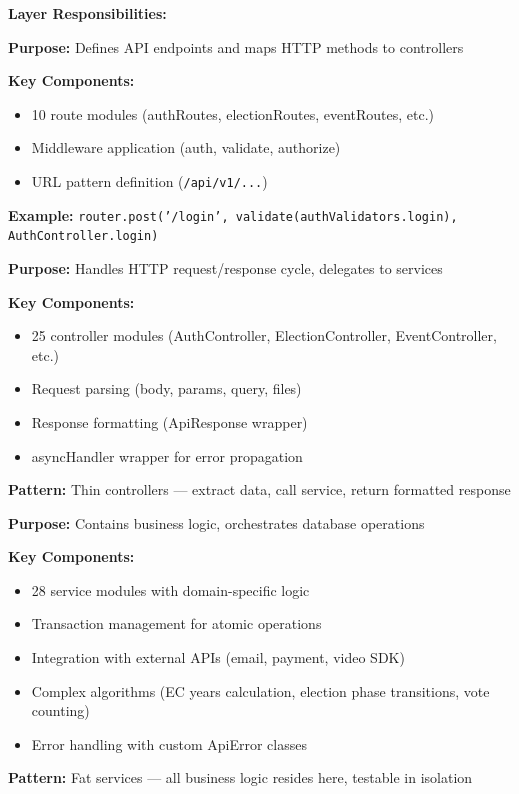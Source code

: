 \documentclass[12pt,a4paper]{article}
\begin{document}
\textbf{Layer Responsibilities:}

\begin{tcolorbox}[colback=LightTeal, colframe=Teal, title=\textbf{1. Routes Layer} (\texttt{src/routes/}), fonttitle=\bfseries]
\textbf{Purpose:} Defines API endpoints and maps HTTP methods to controllers

\textbf{Key Components:}
\begin{itemize}[noitemsep]
  \item 10 route modules (authRoutes, electionRoutes, eventRoutes, etc.)
  \item Middleware application (auth, validate, authorize)
  \item URL pattern definition (\texttt{/api/v1/...})
\end{itemize}

\textbf{Example:} \texttt{router.post('/login', validate(authValidators.login), AuthController.login)}
\end{tcolorbox}

\begin{tcolorbox}[colback=LightBlue, colframe=Teal, title=\textbf{2. Controllers Layer} (\texttt{src/controllers/}), fonttitle=\bfseries]
\textbf{Purpose:} Handles HTTP request/response cycle, delegates to services

\textbf{Key Components:}
\begin{itemize}[noitemsep]
  \item 25 controller modules (AuthController, ElectionController, EventController, etc.)
  \item Request parsing (body, params, query, files)
  \item Response formatting (ApiResponse wrapper)
  \item asyncHandler wrapper for error propagation
\end{itemize}

\textbf{Pattern:} Thin controllers — extract data, call service, return formatted response
\end{tcolorbox}

\begin{tcolorbox}[colback=LightGold, colframe=Teal, title=\textbf{3. Services Layer} (\texttt{src/services/}), fonttitle=\bfseries]
\textbf{Purpose:} Contains business logic, orchestrates database operations

\textbf{Key Components:}
\begin{itemize}[noitemsep]
  \item 28 service modules with domain-specific logic
  \item Transaction management for atomic operations
  \item Integration with external APIs (email, payment, video SDK)
  \item Complex algorithms (EC years calculation, election phase transitions, vote counting)
  \item Error handling with custom ApiError classes
\end{itemize}

\textbf{Pattern:} Fat services — all business logic resides here, testable in isolation
\end{tcolorbox}
\end{document}
